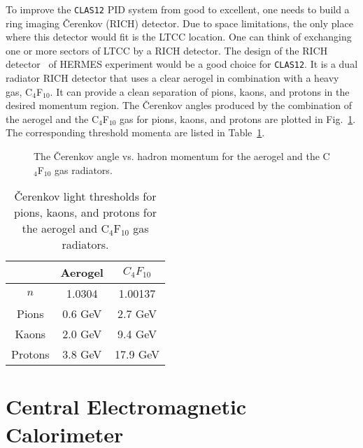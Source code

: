 To improve the {\tt CLAS12} PID system from good to excellent, one needs to 
build a ring imaging {\v C}erenkov (RICH) detector.  Due to space 
limitations, the only place where this detector would fit is the LTCC 
location.  One can think of exchanging one or more sectors of LTCC by 
a RICH detector.  The design of the RICH detector~\cite{Akopov:2000qi} of 
HERMES experiment would be a good choice for {\tt CLAS12}.  It is a dual 
radiator RICH detector that uses a clear aerogel in combination with a heavy 
gas, C$_{4}$F$_{10}$. It can provide a clean separation of pions, kaons, and 
protons in the desired momentum region. The {\v C}erenkov angles produced by 
the combination of the aerogel and the C$_{4}$F$_{10}$ gas for pions, kaons,
and protons are plotted in Fig.~\ref{fig:ccangle}. The corresponding threshold 
momenta are listed in Table~\ref{tab:threshold}.

\begin{figure}
\epsfxsize=10cm
\epsfysize=9cm
\centerline{}
\vspace{-0.3 cm}
\caption{\small{The {\v C}erenkov angle vs. hadron momentum for the 
aerogel and the C$_{4}$F$_{10}$ gas radiators.}}
\label{fig:ccangle}
\end{figure}

\begin{table}
\begin{center}
\begin{tabular}{|c|c|c|} \hline 
       & Aerogel & $C_{4}F_{10}$ \\ \hline                        
$n$    & 1.0304  & 1.00137 \\ \hline 
Pions  & 0.6 GeV & 2.7 GeV \\ \hline 
Kaons  & 2.0 GeV & 9.4 GeV \\ \hline 
Protons& 3.8 GeV & 17.9 GeV \\ \hline 
\end{tabular}
\end{center}
\caption{\small{{\v C}erenkov light thresholds for pions, kaons, and protons 
for the aerogel and C$_{4}$F$_{10}$ gas radiators.}}
\label{tab:threshold}
\end{table}

\section{Central Electromagnetic Calorimeter}

